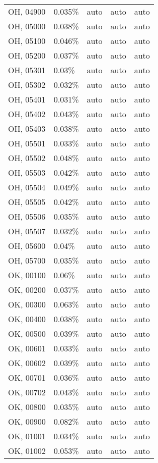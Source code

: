 \begin{longtable}[]{@{}lllll@{}}
OH, 04900 & 0.035\% & auto & auto & auto \\
OH, 05000 & 0.038\% & auto & auto & auto \\
OH, 05100 & 0.046\% & auto & auto & auto \\
OH, 05200 & 0.037\% & auto & auto & auto \\
OH, 05301 & 0.03\% & auto & auto & auto \\
OH, 05302 & 0.032\% & auto & auto & auto \\
OH, 05401 & 0.031\% & auto & auto & auto \\
OH, 05402 & 0.043\% & auto & auto & auto \\
OH, 05403 & 0.038\% & auto & auto & auto \\
OH, 05501 & 0.033\% & auto & auto & auto \\
OH, 05502 & 0.048\% & auto & auto & auto \\
OH, 05503 & 0.042\% & auto & auto & auto \\
OH, 05504 & 0.049\% & auto & auto & auto \\
OH, 05505 & 0.042\% & auto & auto & auto \\
OH, 05506 & 0.035\% & auto & auto & auto \\
OH, 05507 & 0.032\% & auto & auto & auto \\
OH, 05600 & 0.04\% & auto & auto & auto \\
OH, 05700 & 0.035\% & auto & auto & auto \\
OK, 00100 & 0.06\% & auto & auto & auto \\
OK, 00200 & 0.037\% & auto & auto & auto \\
OK, 00300 & 0.063\% & auto & auto & auto \\
OK, 00400 & 0.038\% & auto & auto & auto \\
OK, 00500 & 0.039\% & auto & auto & auto \\
OK, 00601 & 0.033\% & auto & auto & auto \\
OK, 00602 & 0.039\% & auto & auto & auto \\
OK, 00701 & 0.036\% & auto & auto & auto \\
OK, 00702 & 0.043\% & auto & auto & auto \\
OK, 00800 & 0.035\% & auto & auto & auto \\
OK, 00900 & 0.082\% & auto & auto & auto \\
OK, 01001 & 0.034\% & auto & auto & auto \\
OK, 01002 & 0.053\% & auto & auto & auto \\

\end{longtable}

